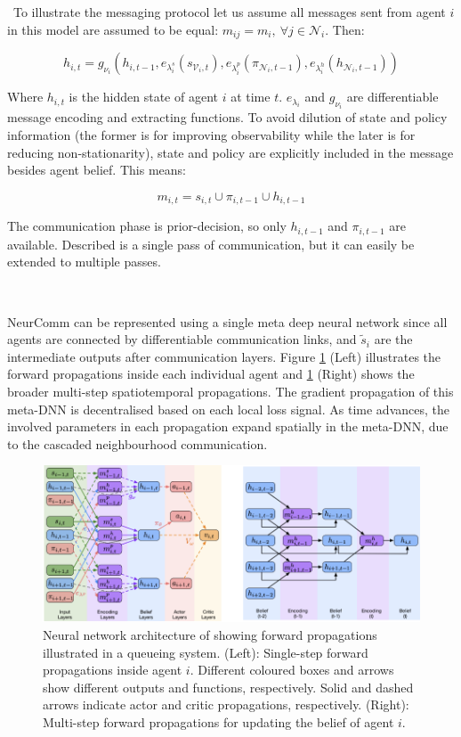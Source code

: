 \documentclass{article}
\begin{document}
\
 To illustrate the messaging protocol let us assume all messages sent from agent $i$ in this model are assumed to be equal: $m_{ij} = m_i, \ \forall j \in \mathcal{N}_i$. Then:

\begin{equation}
	h_{i, t} = g_{\nu_i} (h_{i, t-1}, e_{\lambda_i^s}(s_{\mathcal{V}_i, t}), e_{\lambda_i^p}(\pi_{\mathcal{N}_i, t-1}), e_{\lambda_i^h}(h_{\mathcal{N}_i, t-1}))
\end{equation}

Where $h_{i, t}$ is the hidden state of agent $i$ at time $t$. $e_{\lambda_i}$ and $g_{\nu_i}$ are differentiable message encoding and extracting functions. To avoid dilution of state and policy information (the former is for improving observability while the later is for reducing non-stationarity), state and policy are explicitly included in the message besides agent belief. This means:

\begin{equation}
	m_{i,t} = s_{i,t} \cup \pi_{i,t−1} \cup h_{i,t−1}
\end{equation}

The communication phase is prior-decision, so only $h_{i,t−1}$ and $\pi_{i,t−1}$ are available. Described is a single pass of communication, but it can easily be extended to multiple passes. 

\

NeurComm can be represented using a single meta deep neural network  since all agents are connected by differentiable communication links, and $\tilde{s}_i$ are the intermediate outputs after communication layers. Figure \ref{fig:neurcomm} (Left) illustrates the forward propagations inside each individual agent and \ref{fig:neurcomm} (Right) shows the broader multi-step spatiotemporal propagations. The gradient propagation of this meta-DNN is decentralised based on each local loss signal. As time advances, the involved parameters in each propagation expand spatially in the meta-DNN, due to the cascaded neighbourhood communication.

\begin{figure}
	\centering
	\includegraphics[scale=0.5]{images/neurcomm}
	\caption{Neural network architecture of \citet{chu2020NeurComm} showing forward propagations illustrated in a queueing system. (Left): Single-step forward propagations inside agent $i$. Different coloured boxes and arrows show different outputs and functions, respectively. Solid and dashed arrows indicate actor and critic propagations, respectively. (Right): Multi-step forward propagations for updating the belief of agent $i$.}
	\label{fig:neurcomm}
\end{figure}
\end{document}
